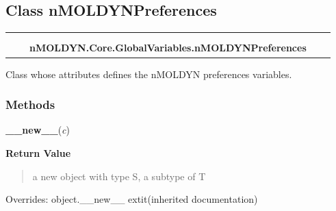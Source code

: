 
\subsection{Class nMOLDYNPreferences}

    \label{nMOLDYN:Core:GlobalVariables:nMOLDYNPreferences}
\begin{tabular}{cccccc}
\multicolumn{2}{r}{\settowidth{\BCL}{object}\multirow{2}{\BCL}{object}}
&&
  \\\cline{3-3}
  &&\multicolumn{1}{c|}{}
&&
  \\
&&\multicolumn{2}{l}{\textbf{nMOLDYN.Core.GlobalVariables.nMOLDYNPreferences}}
\end{tabular}

Class whose attributes defines the nMOLDYN preferences variables.



  \subsubsection{Methods}

    \vspace{0.5ex}

\hspace{.8\funcindent}\begin{boxedminipage}{\funcwidth}

    \raggedright \textbf{\_\_new\_\_}(\textit{c})

\setlength{\parskip}{2ex}
\setlength{\parskip}{1ex}
      \textbf{Return Value}
    \vspace{-1ex}

      \begin{quote}
      a new object with type S, a subtype of T

      \end{quote}

      Overrides: object.\_\_new\_\_ 	extit{(inherited documentation)}

    \end{boxedminipage}

